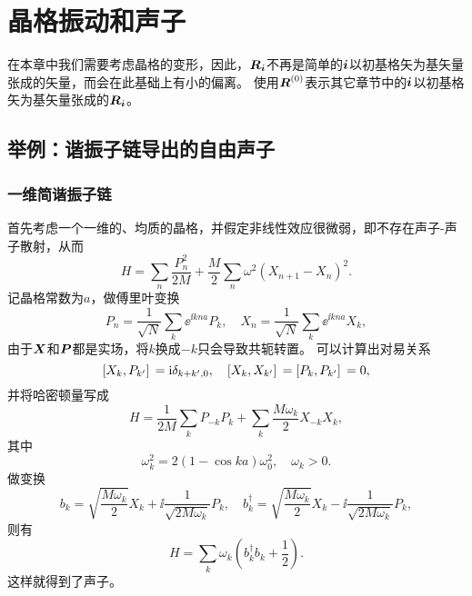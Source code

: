 \chapter{晶格振动和声子}\label{chap:phonon}

在本章中我们需要考虑晶格的变形，因此，$\vb*{R}_{\vb*{i}}$不再是简单的$\vb*{i}$以初基格矢为基矢量张成的矢量，而会在此基础上有小的偏离。
使用$\vb*{R}^{(0)}$表示其它章节中的$\vb*{i}$以初基格矢为基矢量张成的$\vb*{R}_{\vb*{i}}$。

\section{举例：谐振子链导出的自由声子}

\subsection{一维简谐振子链}

首先考虑一个一维的、均质的晶格，并假定非线性效应很微弱，即不存在声子-声子散射，从而
\begin{equation}
    {H} = \sum_n \frac{{P}_n^2}{2 M} + \frac{M}{2} \sum_{n} \omega^2 ({X}_{n+1} - {X}_{n})^2.
    \label{eq:one-dim-osc-hamiltonian}
\end{equation}
记晶格常数为$a$，做傅里叶变换
\[
    {P}_n = \frac{1}{\sqrt{N}} \sum_{k} \ee^{\ii k n a} {P}_k, \quad {X}_n = \frac{1}{\sqrt{N}} \sum_{k} \ee^{\ii k n a} {X}_k,
\]
由于$\vb*{X}$和$\vb*{P}$都是实场，将$k$换成$-k$只会导致共轭转置。
可以计算出对易关系
\begin{equation}
    \comm*{{X}_{k}}{{P}_{k'}} = \ii \delta_{k+k', 0}, \quad \comm*{{X}_{k}}{{X}_{k'}} = \comm*{{P}_{k}}{{P}_{k'}} = 0,
\end{equation}
并将哈密顿量写成
\[
    {H} = \frac{1}{2M} \sum_{k} {P}_{-k} {P}_{k} + \sum_k \frac{M \omega_{k}}{2} {X}_{-k} {X}_k,
\]
其中
\begin{equation}
    \omega_k^2 = 2 (1 - \cos k a) \omega_0^2, \quad \omega_k > 0.
\end{equation}
做变换
\begin{equation}
    {b}_{k} = \sqrt{\frac{M \omega_k}{2}} {X}_k + \ii \frac{1}{\sqrt{2 M \omega_k}} P_k, \quad {b}^\dagger_{k} = \sqrt{\frac{M \omega_k}{2}} {X}_k - \ii \frac{1}{\sqrt{2 M \omega_k}} P_k,
\end{equation}
则有
\begin{equation}
    {H} = \sum_k \omega_k \left({b}^\dagger_k {b}_k + \frac{1}{2}\right).
\end{equation}
这样就得到了声子。

